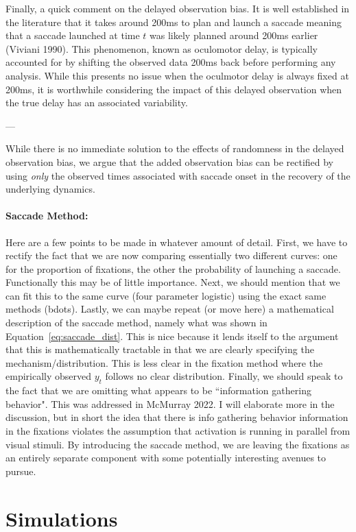 \documentclass{article}
\begin{document}
Finally, a quick comment on the delayed observation bias. It is well established in the literature that it takes around 200ms to plan and launch a saccade meaning that a saccade launched at time $t$ was likely planned around 200ms earlier (Viviani 1990). This phenomenon, known as oculomotor delay, is typically accounted for by shifting the observed data 200ms back before performing any analysis. While this presents no issue when the oculmotor delay is always fixed at 200ms, it is worthwhile considering the impact of this delayed observation when the true delay has an associated variability.

---

While there is no immediate solution to the effects of randomness in the delayed observation bias, we argue that the added observation bias can be rectified by using \textit{only} the observed times associated with saccade onset in the recovery of the underlying dynamics.


\paragraph{Saccade Method:} Here are a few points to be made in whatever amount of detail. First, we have to rectify the fact that we are now comparing essentially two different curves: one for the proportion of fixations, the other the probability of launching a saccade. Functionally this may be of little importance. Next, we should mention that we can fit this to the same curve (four parameter logistic) using the exact same methods (bdots). Lastly, we can maybe repeat (or move here) a mathematical description of the saccade method, namely what was shown in Equation~\ref{eq:saccade_dist}. This is nice because it lends itself to the argument that this is mathematically tractable in that we are clearly specifying the mechanism/distribution. This is less clear in the fixation method where the empirically observed $y_t$ follows no clear distribution. Finally, we should speak to the fact that we are omitting what appears to be ``information gathering behavior". This was addressed in McMurray 2022. I will elaborate more in the discussion, but in short the idea that there is info gathering behavior information in the fixations violates the assumption that activation is running in parallel from visual stimuli. By introducing the saccade method, we are leaving the fixations as an entirely separate component with some potentially interesting avenues to pursue.

\section{Simulations}
\end{document}
